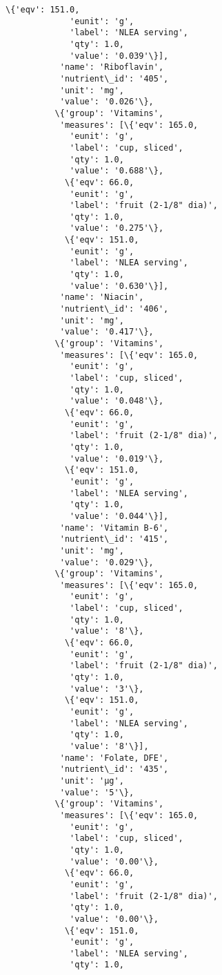\documentclass[11pt]{article}
\begin{document}
\begin{Verbatim}[commandchars=\\\{\}]
            \{'eqv': 151.0,
             'eunit': 'g',
             'label': 'NLEA serving',
             'qty': 1.0,
             'value': '0.039'\}],
           'name': 'Riboflavin',
           'nutrient\_id': '405',
           'unit': 'mg',
           'value': '0.026'\},
          \{'group': 'Vitamins',
           'measures': [\{'eqv': 165.0,
             'eunit': 'g',
             'label': 'cup, sliced',
             'qty': 1.0,
             'value': '0.688'\},
            \{'eqv': 66.0,
             'eunit': 'g',
             'label': 'fruit (2-1/8" dia)',
             'qty': 1.0,
             'value': '0.275'\},
            \{'eqv': 151.0,
             'eunit': 'g',
             'label': 'NLEA serving',
             'qty': 1.0,
             'value': '0.630'\}],
           'name': 'Niacin',
           'nutrient\_id': '406',
           'unit': 'mg',
           'value': '0.417'\},
          \{'group': 'Vitamins',
           'measures': [\{'eqv': 165.0,
             'eunit': 'g',
             'label': 'cup, sliced',
             'qty': 1.0,
             'value': '0.048'\},
            \{'eqv': 66.0,
             'eunit': 'g',
             'label': 'fruit (2-1/8" dia)',
             'qty': 1.0,
             'value': '0.019'\},
            \{'eqv': 151.0,
             'eunit': 'g',
             'label': 'NLEA serving',
             'qty': 1.0,
             'value': '0.044'\}],
           'name': 'Vitamin B-6',
           'nutrient\_id': '415',
           'unit': 'mg',
           'value': '0.029'\},
          \{'group': 'Vitamins',
           'measures': [\{'eqv': 165.0,
             'eunit': 'g',
             'label': 'cup, sliced',
             'qty': 1.0,
             'value': '8'\},
            \{'eqv': 66.0,
             'eunit': 'g',
             'label': 'fruit (2-1/8" dia)',
             'qty': 1.0,
             'value': '3'\},
            \{'eqv': 151.0,
             'eunit': 'g',
             'label': 'NLEA serving',
             'qty': 1.0,
             'value': '8'\}],
           'name': 'Folate, DFE',
           'nutrient\_id': '435',
           'unit': 'µg',
           'value': '5'\},
          \{'group': 'Vitamins',
           'measures': [\{'eqv': 165.0,
             'eunit': 'g',
             'label': 'cup, sliced',
             'qty': 1.0,
             'value': '0.00'\},
            \{'eqv': 66.0,
             'eunit': 'g',
             'label': 'fruit (2-1/8" dia)',
             'qty': 1.0,
             'value': '0.00'\},
            \{'eqv': 151.0,
             'eunit': 'g',
             'label': 'NLEA serving',
             'qty': 1.0,

\end{Verbatim}
\end{document}
